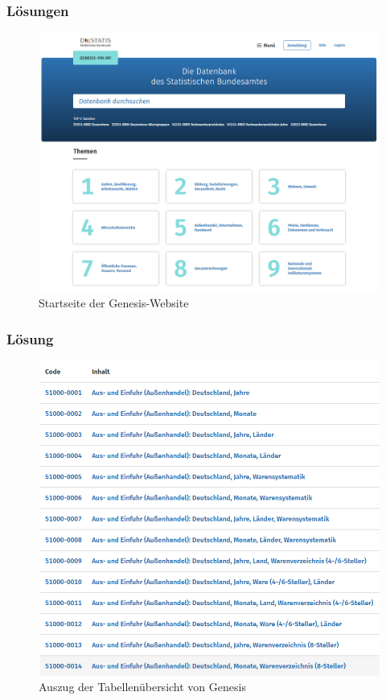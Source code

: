 \documentclass{beamer}
\begin{document}
\begin{frame}
	\frametitle{Lösungen}
	\begin{figure}[h]
		\caption{Startseite der Genesis-Website}
		\centering
		\includegraphics[scale=0.15]{6_Denesis_Destatis}
	\end{figure}
\end{frame}

\begin{frame}
	\frametitle{Lösung}
	\begin{figure}[h]
		\caption{Auszug der Tabellenübersicht von Genesis}
		\centering
		\includegraphics[scale=0.2]{8_Tabellen_codes}
	\end{figure}
\end{frame}
\end{document}
